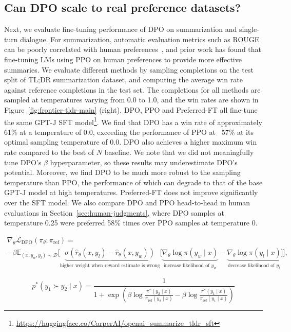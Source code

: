 \subsection{Can DPO scale to real preference datasets?}
\label{sec:dpo-real-datasets}
Next, we evaluate fine-tuning performance of DPO on summarization and single-turn dialogue. For summarization, automatic evaluation metrics such as ROUGE can be poorly correlated with human preferences~\citep{stiennon2022learning}, and prior work has found that fine-tuning LMs using PPO on human preferences to provide more effective summaries. We evaluate different methods by sampling completions on the test split of TL;DR summarization dataset, and computing the average win rate against reference completions in the test set. The completions for all methods are sampled at temperatures varying from 0.0 to 1.0, and the win rates are shown in Figure~\ref{fig:frontier-tldr-main} (right). DPO, PPO and Preferred-FT all fine-tune the same GPT-J SFT model\footnote{\url{https://huggingface.co/CarperAI/openai_summarize_tldr_sft}}. We find that DPO has a win rate of approximately 61\% at a temperature of 0.0, exceeding the performance of PPO at ~57\% at its optimal sampling temperature of 0.0. DPO also achieves a higher maximum win rate compared to the best of $N$ baseline. We note that we did not meaningfully tune DPO's $\beta$ hyperparameter, so these results may underestimate DPO's potential. Moreover, we find DPO to be much more robust to the sampling temperature than PPO, the performance of which can degrade to that of the base GPT-J model at high temperatures. Preferred-FT does not improve significantly over the SFT model. We also compare DPO and PPO head-to-head in human evaluations in Section~\ref{sec:human-judgments}, where DPO samples at temperature 0.25 were preferred 58\% times over PPO samples at temperature 0.

\begin{multline*}\label{eq:gradient}
    \nabla_\theta \mathcal{L}_\text{DPO}(\pi_\theta;\pi_\text{ref}) = \\ -\beta\mathbb{E}_{(x, y_w, y_l) \sim \mathcal{D}} \bigg[\underbrace{\sigma(\hat{r}_\theta(x, y_l) - \hat{r}_\theta (x, y_w))}_\text{higher weight when reward estimate is wrong}\bigg[\underbrace{\nabla_\theta\log \pi(y_w \mid x)}_\text{increase likelihood of $y_w$} - \underbrace{\nabla_\theta\log\pi(y_l \mid x)}_\text{decrease likelihood of $y_l$}\bigg]\bigg],
\end{multline*}

\begin{equation}\label{eq:objective}
    p^*(y_1\succ y_2 \mid x)=\frac{1}{1 + \exp\left(\beta \log \frac{\pi^*(y_2\mid x)}{\pi_\text{ref}(y_2\mid x)} - \beta \log \frac{\pi^*(y_1\mid x)}{\pi_\text{ref}(y_1\mid x)}\right)}
\end{equation}

